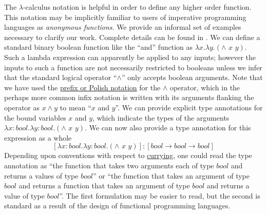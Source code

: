 The $\lambda$-calculus notation is helpful in
order to define any higher order function. This notation may be
implicitly familiar to users of imperative programming languages as {\it anonymous functions}. We provide an informal set of examples necessary to clarify our work. Complete details can be found in \cite{Barendregt1985}. We can define a
standard binary boolean function like the ``and'' function as $\lambda x. \lambda y.(\wedge\,\,x\,\,y)$. Such a lambda expression can apparently be applied to any inputs;
however the inputs to such a function are not necessarily restricted to
booleans unless we infer that the standard logical operator
``$\wedge$'' only accepts boolean arguments.
Note that we have used the
\href{http://en.wikipedia.org/wiki/Polish\_notation}{prefix or Polish
notation} for the $\wedge$ operator, which
in the perhaps more common infix notation is written with its arguments
flanking the operator as $x \wedge y$ to mean
``$x$ and
$y$''. We can provide explicit type
annotations for the bound variables $x$
and $y$, which indicate the types of
the arguments $\lambda x:bool. \lambda y:bool.(\wedge\,\,x\,\,y)$. We can now also provide a type annotation for this expression as a whole
\begin{equation}\label{eq:boolfulltype}
[\lambda x:bool. \lambda y:bool.(\wedge\,\,x\,\,y)]:[bool \rightarrow bool \rightarrow bool]
\end{equation}
Depending upon conventions with respect to
\href{http://en.wikipedia.org/wiki/Currying}{currying}, one could read
the type annotation as ``the function that takes two arguments each of
type $bool$ and returns a values of type
$bool$'' or ``the function that takes an
argument of type $bool$ and returns a
function that takes an argument of type
$bool$ and returns a value of type
$bool$''. The first formulation may be
easier to read, but the second is standard as a result of the design of
functional programming languages.

